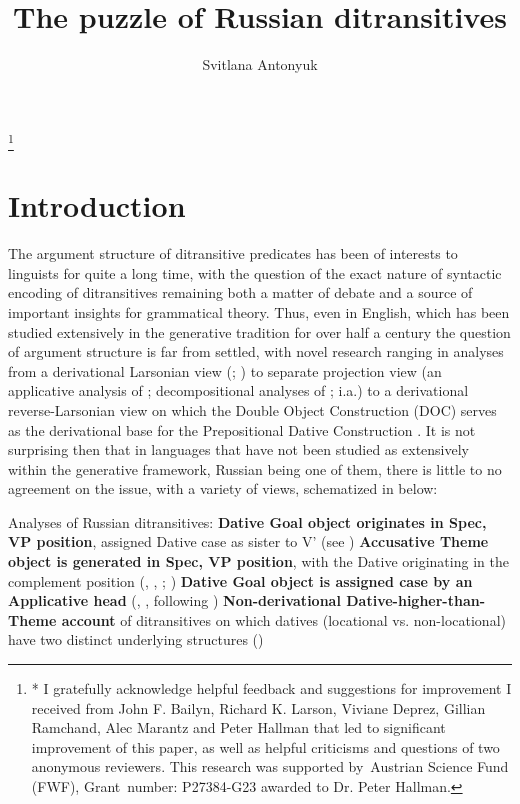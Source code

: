 \documentclass[output=paper,colorlinks,citecolor=brown]{./langscibook}
\author{Svitlana Antonyuk	\affiliation{University of Connecticut}}
\title{The puzzle of Russian ditransitives}
\begin{document}
\maketitle
 
\footnote{* I gratefully acknowledge helpful feedback and suggestions for improvement I received from John F. Bailyn, Richard K. Larson, Viviane Deprez, Gillian Ramchand, Alec Marantz and Peter Hallman that led to significant improvement of this paper, as well as helpful criticisms and questions of two anonymous reviewers. This research was supported by~Austrian Science Fund (FWF), Grant~number: P27384-G23 awarded to Dr. Peter Hallman.}



\section{Introduction}\label{sec:antonyuk:1}

The argument structure of ditransitive predicates has been of interests to linguists for quite a long time, with the question of the exact nature of syntactic encoding of ditransitives remaining both a matter of debate and a source of important insights for grammatical theory. Thus, even in English, which has been studied extensively in the generative tradition for over half a century the question of argument structure is far from settled, with novel research ranging in analyses from a derivational Larsonian view (\citealt{Larson1988}; \citeyear{Larson2014}) to separate projection view (an applicative analysis of \citealt{Marantz1993}; decompositional analyses of \citealt{Pesetsky1995, Harley1995Diss}; \citeyear{Harley2002} i.a.) to a derivational reverse-Larsonian view on which the Double Object Construction (DOC) serves as the derivational base for the Prepositional Dative Construction \citep{Hallman2015}. It is not surprising then that in languages that have not been studied as extensively within the generative framework, Russian being one of them, there is little to no agreement on the issue, with a variety of views, schematized in  below:

\ea%
    \label{ex:antonyuk:1}
    Analyses of Russian ditransitives:
    \ea \textbf{Dative Goal object originates in Spec, VP position}, assigned Dative case as sister to V’ (see \citealt{HarbertToribio1991, GreenbergFranks1991, Franks1995, Richardson2007})
    \ex \textbf{Accusative Theme object is generated in Spec, VP position}, with the Dative originating in the complement position (\citealt{Bailyn1995}, \citeyear{Bailyn2010}, \citeyear{Bailyn2012}; \citealt{Titov2017})
    \ex \textbf{Dative Goal object is assigned case by an Applicative head} (\citealt{Dyakonova2005}, \citeyear{Dyakonova2009}, following \citealt{Pylkkänen2002})
    \ex \textbf{Non-derivational Dative-higher-than-Theme account} of ditransitives on which datives (locational vs. non-locational) have two distinct underlying structures (\citealt{BonehNash2017})
    \z
\z
\end{document}
